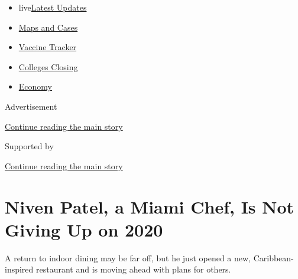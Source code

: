 \begin{itemize}
\tightlist
\item
  live\href{https://www.nytimes3xbfgragh.onion/2020/08/20/world/coronavirus-covid.html?name=styln-coronavirus-national\&region=TOP_BANNER\&variant=undefined\&block=storyline_menu_recirc\&action=click\&pgtype=Article\&impression_id=bcdbc461-e38b-11ea-ab31-cfe12db18fb4}{Latest
  Updates}
\item
  \href{https://www.nytimes3xbfgragh.onion/interactive/2020/us/coronavirus-us-cases.html?name=styln-coronavirus-national\&region=TOP_BANNER\&variant=undefined\&block=storyline_menu_recirc\&action=click\&pgtype=Article\&impression_id=bcdbeb70-e38b-11ea-ab31-cfe12db18fb4}{Maps
  and Cases}
\item
  \href{https://www.nytimes3xbfgragh.onion/interactive/2020/science/coronavirus-vaccine-tracker.html?name=styln-coronavirus-national\&region=TOP_BANNER\&variant=undefined\&block=storyline_menu_recirc\&action=click\&pgtype=Article\&impression_id=bcdbeb71-e38b-11ea-ab31-cfe12db18fb4}{Vaccine
  Tracker}
\item
  \href{https://www.nytimes3xbfgragh.onion/2020/08/19/us/colleges-closing-covid.html?name=styln-coronavirus-national\&region=TOP_BANNER\&variant=undefined\&block=storyline_menu_recirc\&action=click\&pgtype=Article\&impression_id=bcdbeb72-e38b-11ea-ab31-cfe12db18fb4}{Colleges
  Closing}
\item
  \href{https://www.nytimes3xbfgragh.onion/live/2020/08/20/business/stock-market-today-coronavirus?name=styln-coronavirus-national\&region=TOP_BANNER\&variant=undefined\&block=storyline_menu_recirc\&action=click\&pgtype=Article\&impression_id=bcdbeb73-e38b-11ea-ab31-cfe12db18fb4}{Economy}
\end{itemize}

Advertisement

\protect\hyperlink{after-top}{Continue reading the main story}

Supported by

\protect\hyperlink{after-sponsor}{Continue reading the main story}

\hypertarget{niven-patel-a-miami-chef-is-not-giving-up-on-2020}{%
\section{Niven Patel, a Miami Chef, Is Not Giving Up on
2020}\label{niven-patel-a-miami-chef-is-not-giving-up-on-2020}}

A return to indoor dining may be far off, but he just opened a new,
Caribbean-inspired restaurant and is moving ahead with plans for others.

